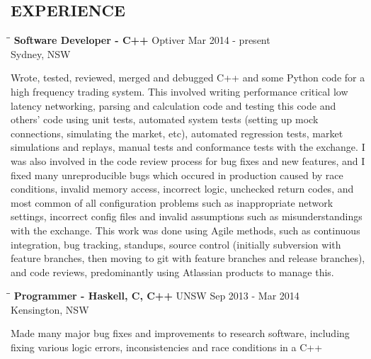 \documentclass{res}
\begin{document}
\begin{resume}
\section{EXPERIENCE}
   \vspace{-0.1in}	
   \begin{tabbing}
   \hspace{2.3in}\= \hspace{2.6in}\= \kill %
    {\bf Software Developer - C++} \>Optiver \>Mar 2014 - present\\
                                   \>Sydney, NSW
   \end{tabbing}\vspace{-20pt}      %
    Wrote, tested, reviewed, merged and debugged C++ and some Python code for a
    high frequency trading system. This involved writing performance critical
    low latency networking, parsing and calculation code and testing this code
    and others' code using unit tests, automated system tests (setting up mock
    connections, simulating the market, etc), automated regression tests,
    market simulations and replays, manual tests and conformance tests with the
    exchange. I was also involved in the code review process for bug fixes and
    new features, and I fixed many unreproducible bugs which occured in
    production caused by race conditions, invalid memory access, incorrect
    logic, unchecked return codes, and most common of all configuration
    problems such as inappropriate network settings, incorrect config files and
    invalid assumptions such as misunderstandings with the exchange. This work
    was done using Agile methods, such as continuous integration, bug tracking,
    standups, source control (initially subversion with feature branches, then
    moving to git with feature branches and release branches), and code
    reviews, predominantly using Atlassian products to manage this.
   \begin{tabbing}
   \hspace{2.3in}\= \hspace{2.6in}\= \kill %
    {\bf Programmer - Haskell, C, C++} \>UNSW \>Sep 2013 - Mar 2014\\
                                       \>Kensington, NSW
   \end{tabbing}\vspace{-20pt}      %
    Made many major bug fixes and improvements to research software, including
    fixing various logic errors, inconsistencies and race conditions in a C++

\end{resume}
\end{document}
